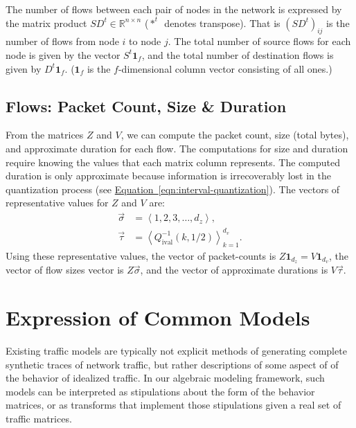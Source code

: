 \documentclass[conference]{IEEEtran}
\newcommand{\Equation}[1]{\hyperref[eqn:#1]{Equation~\ref*{eqn:#1}}}
\newcommand{\R}{\mathbb{R}}
\newcommand{\Di}{Q^{-1}_{\text{ival}}}
\newcommand{\ones}[1]{\mathbf{1}_{#1}}
\newcommand{\seq}[1]{\left<#1\right>}
\newcommand{\fracx}[2]{#1/#2}
\begin{document}
The number of flows between each pair of nodes in the network is expressed by the matrix product $SD^t\in\R^{n \times n}$ ($*^t$~denotes transpose). That is $(SD^t)_{ij}$ is the number of flows from node $i$ to node $j$. The total number of source flows for each node is given by the vector $S^t\ones{f}$, and the total number of destination flows is given by $D^t\ones{f}$. ($\ones{f}$ is the $f$-dimensional column vector consisting of all ones.)

\subsection{Flows: Packet Count, Size \& Duration}
\label{sec:flow-totals}

From the matrices $Z$ and $V$, we can compute the packet count, size (total bytes), and approximate duration for each flow. The computations for size and duration require knowing the values that each matrix column represents. The computed duration is only approximate because information is irrecoverably lost in the quantization process (see \Equation{interval-quantization}). The vectors of representative values for $Z$ and $V$ are:
\begin{align}
\vec{\sigma}&=\seq{1,2,3,\dots,d_z},\\
\vec{\tau}&=\seq{\Di\left(k,\fracx{1}{2}\right)}_{k=1}^{d_v}.
\end{align}
Using these representative values, the vector of packet-counts is $Z\ones{d_z}=V\ones{d_v}$, the vector of flow sizes vector is $Z\vec{\sigma}$, and the vector of approximate durations is $V\vec{\tau}$.



\section{Expression of Common Models}

Existing traffic models are typically not explicit methods of generating complete synthetic traces of network traffic, but rather descriptions of some aspect of of the behavior of idealized traffic. In our algebraic modeling framework, such models can be interpreted as stipulations about the form of the behavior matrices, or as transforms that implement those stipulations given a real set of traffic matrices.
\end{document}
